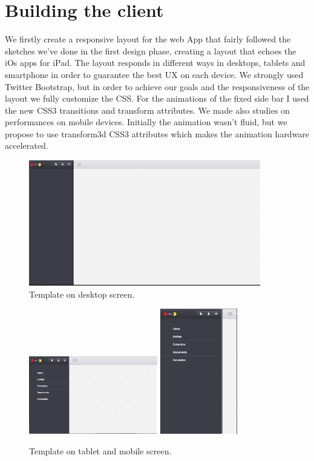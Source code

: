 \documentclass[a4paper,13pt]{report}
\begin{document}
\section{Building the client}
We firstly create a responsive layout for the web App that fairly followed the sketches we've done in the first design phase, creating a layout that echoes the iOs  apps for iPad.
The layout responds in different ways in desktops, tablets and smartphone in order to guarantee the best UX on each device.
We strongly used Twitter Bootstrap, but in order to achieve our goals and the responsiveness of the layout we fully customize the CSS.
For the animations of the fixed side bar I used the new CSS3 transitions and transform attributes.
We made also studies on performances on mobile devices. Initially the animation wasn't fluid, but we propose to use transform3d CSS3 attributes which makes the animation hardware accelerated.
\begin{figure}[H]
  \caption{Template on desktop screen.}
  \centering
    \includegraphics[width=0.9\textwidth]{pics/proto/desktopEmpty}
\end{figure}\begin{figure}[H]
  \caption{Template on tablet  and mobile screen.}
  \centering
    \includegraphics[width=0.5\textwidth]{pics/proto/tabletEmpty}
    \includegraphics[width=0.3\textwidth]{pics/proto/mobileEmpty}
\end{figure}
\end{document}
